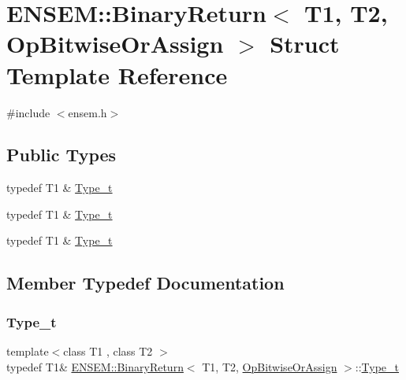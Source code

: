 \hypertarget{structENSEM_1_1BinaryReturn_3_01T1_00_01T2_00_01OpBitwiseOrAssign_01_4}{}\section{E\+N\+S\+EM\+:\+:Binary\+Return$<$ T1, T2, Op\+Bitwise\+Or\+Assign $>$ Struct Template Reference}
\label{structENSEM_1_1BinaryReturn_3_01T1_00_01T2_00_01OpBitwiseOrAssign_01_4}


{\ttfamily \#include $<$ensem.\+h$>$}

\subsection*{Public Types}
\begin{DoxyCompactItemize}
\item 
typedef T1 \& \mbox{\hyperlink{structENSEM_1_1BinaryReturn_3_01T1_00_01T2_00_01OpBitwiseOrAssign_01_4_a26b576167f103506b9c1a03f33944d0f}{Type\+\_\+t}}
\item 
typedef T1 \& \mbox{\hyperlink{structENSEM_1_1BinaryReturn_3_01T1_00_01T2_00_01OpBitwiseOrAssign_01_4_a26b576167f103506b9c1a03f33944d0f}{Type\+\_\+t}}
\item 
typedef T1 \& \mbox{\hyperlink{structENSEM_1_1BinaryReturn_3_01T1_00_01T2_00_01OpBitwiseOrAssign_01_4_a26b576167f103506b9c1a03f33944d0f}{Type\+\_\+t}}
\end{DoxyCompactItemize}


\subsection{Member Typedef Documentation}
\mbox{\label{structENSEM_1_1BinaryReturn_3_01T1_00_01T2_00_01OpBitwiseOrAssign_01_4_a26b576167f103506b9c1a03f33944d0f}} 
\subsubsection{\texorpdfstring{Type\_t}{Type\_t}\hspace{0.1cm}{\footnotesize\ttfamily [1/3]}}
{\footnotesize\ttfamily template$<$class T1 , class T2 $>$ \\
typedef T1\& \mbox{\hyperlink{structENSEM_1_1BinaryReturn}{E\+N\+S\+E\+M\+::\+Binary\+Return}}$<$ T1, T2, \mbox{\hyperlink{structENSEM_1_1OpBitwiseOrAssign}{Op\+Bitwise\+Or\+Assign}} $>$\+::\mbox{\hyperlink{structENSEM_1_1BinaryReturn_3_01T1_00_01T2_00_01OpBitwiseOrAssign_01_4_a26b576167f103506b9c1a03f33944d0f}{Type\+\_\+t}}}

